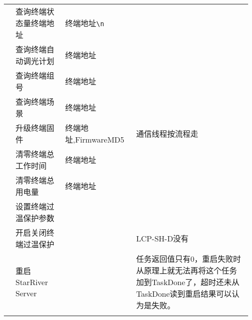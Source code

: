 \begin{longtabu}[c]{@{}rXXX@{}}
\\ & 查询终端状态量终端地址 & 终端地址\texttt{\textbackslash{}n} &
\\ & 查询终端自动调光计划 & 终端地址 &
\\ & 查询终端组号 & 终端地址 &
\\ & 查询终端场景 & 终端地址 &
\\ & 升级终端固件 & 终端地址,FirmwareMD5 & 通信线程按流程走
\\ & 清零终端总工作时间 & 终端地址 &
\\ & 清零终端总用电量 & 终端地址 &
\\ & 设置终端过温保护参数 & &
\\ & 开启关闭终端过温保护 & & LCP-SH-D没有
\\ & 重启StarRiver Server & &
任务返回值只有0，重启失败时从原理上就无法再将这个任务加到TaskDone了，超时还未从TaskDone读到重启结果可以认为是失败。
\\\addlinespace
\bottomrule
\end{longtabu}

